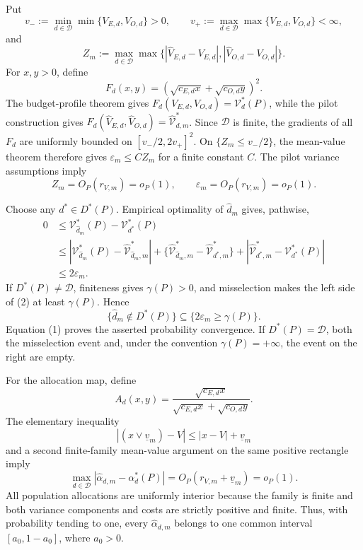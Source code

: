 Put
\[
 v_-:=\min_{d\in\mathcal D}\min\{V_{E,d},V_{O,d}\}>0,
 \qquad
 v_+:=\max_{d\in\mathcal D}\max\{V_{E,d},V_{O,d}\}<\infty,
\]
and
\[
 Z_m:=\max_{d\in\mathcal D}\max\{|\widehat V_{E,d}-V_{E,d}|,
 |\widehat V_{O,d}-V_{O,d}|\}.
\]
For \(x,y>0\), define
\[
 F_d(x,y)=\left(\sqrt{c_{E,d}x}+\sqrt{c_{O,d}y}\right)^2.
\]
The budget-profile theorem gives \(F_d(V_{E,d},V_{O,d})=\mathcal V_d^*(P)\), while the pilot construction gives \(F_d(\widehat V_{E,d},\widehat V_{O,d})=\widehat{\mathcal V}_{d,m}^*\).  Since \(\mathcal D\) is finite, the gradients of all \(F_d\) are uniformly bounded on \([v_-/2,2v_+]^2\).  On \(\{Z_m\le v_-/2\}\), the mean-value theorem therefore gives \(\varepsilon_m\le C Z_m\) for a finite constant \(C\).  The pilot variance assumptions imply
\[
 Z_m=O_P(r_{V,m})=o_P(1),\qquad
 \varepsilon_m=O_P(r_{V,m})=o_P(1). \tag{1}
\]

Choose any \(d^*\in D^*(P)\).  Empirical optimality of \(\widehat d_m\) gives, pathwise,
\[
\begin{aligned}
0&\le \mathcal V_{\widehat d_m}^*(P)-\mathcal V_{d^*}^*(P)\\
&\le |\mathcal V_{\widehat d_m}^*(P)-\widehat{\mathcal V}_{\widehat d_m,m}^*|
 +\{\widehat{\mathcal V}_{\widehat d_m,m}^*-\widehat{\mathcal V}_{d^*,m}^*\}
 +|\widehat{\mathcal V}_{d^*,m}^*-\mathcal V_{d^*}^*(P)|\\
&\le2\varepsilon_m. 
\end{aligned} \tag{2}
\]
If \(D^*(P)\ne\mathcal D\), finiteness gives \(\gamma(P)>0\), and misselection makes the left side of (2) at least \(\gamma(P)\).  Hence
\[
 \{\widehat d_m\notin D^*(P)\}\subseteq
 \{2\varepsilon_m\ge\gamma(P)\}.
\]
Equation (1) proves the asserted probability convergence.  If \(D^*(P)=\mathcal D\), both the misselection event and, under the convention \(\gamma(P)=+\infty\), the event on the right are empty.

For the allocation map, define
\[
 A_d(x,y)=\frac{\sqrt{c_{E,d}x}}
 {\sqrt{c_{E,d}x}+\sqrt{c_{O,d}y}}.
\]
The elementary inequality
\[
 |(x\vee\underline v_m)-V|\le |x-V|+\underline v_m
\]
and a second finite-family mean-value argument on the same positive rectangle imply
\[
 \max_{d\in\mathcal D}|\widehat\alpha_{d,m}-\alpha_d^*(P)|
 =O_P(r_{V,m}+\underline v_m)=o_P(1). \tag{3}
\]
All population allocations are uniformly interior because the family is finite and both variance components and costs are strictly positive and finite.  Thus, with probability tending to one, every \(\widehat\alpha_{d,m}\) belongs to one common interval \([a_0,1-a_0]\), where \(a_0>0\).

